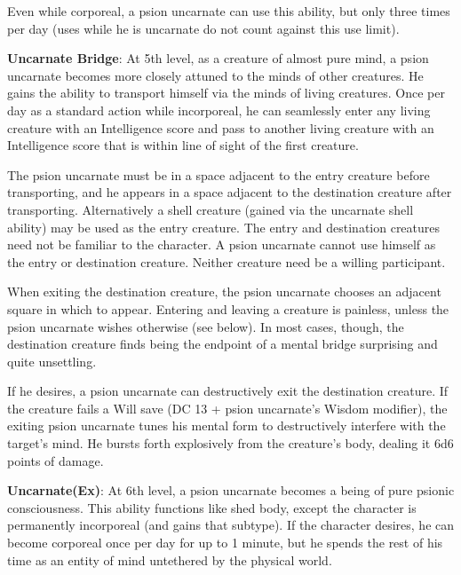 Even while corporeal, a psion uncarnate can use this ability, but only three times per day (uses while he is uncarnate do not count against this use limit).

\textbf{Uncarnate Bridge}: At 5th level, as a creature of almost pure mind, a psion uncarnate becomes more closely attuned to the minds of other creatures. He gains the ability to transport himself via the minds of living creatures. Once per day as a standard action while incorporeal, he can seamlessly enter any living creature with an Intelligence score and pass to another living creature with an Intelligence score that is within line of sight of the first creature.

The psion uncarnate must be in a space adjacent to the entry creature before transporting, and he appears in a space adjacent to the destination creature after transporting. Alternatively a shell creature (gained via the uncarnate shell ability) may be used as the entry creature. The entry and destination creatures need not be familiar to the character. A psion uncarnate cannot use himself as the entry or destination creature. Neither creature need be a willing participant.

When exiting the destination creature, the psion uncarnate chooses an adjacent square in which to appear. Entering and leaving a creature is painless, unless the psion uncarnate wishes otherwise (see below). In most cases, though, the destination creature finds being the endpoint of a mental bridge surprising and quite unsettling.

If he desires, a psion uncarnate can destructively exit the destination creature. If the creature fails a Will save (DC 13 + psion uncarnate's Wisdom modifier), the exiting psion uncarnate tunes his mental form to destructively interfere with the target's mind. He bursts forth explosively from the creature's body, dealing it 6d6 points of damage.

\textbf{Uncarnate(Ex)}: At 6th level, a psion uncarnate becomes a being of pure psionic consciousness. This ability functions like shed body, except the character is permanently incorporeal (and gains that subtype). If the character desires, he can become corporeal once per day for up to 1 minute, but he spends the rest of his time as an entity of mind untethered by the physical world.